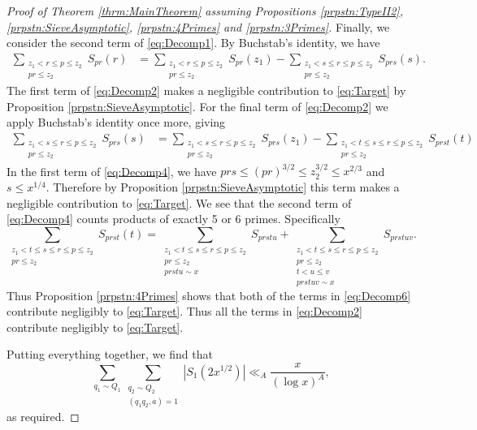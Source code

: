 \documentclass[10pt]{amsart}
\theoremstyle{plain}
\numberwithin{equation}{section}
\begin{document}
\begin{proof}[Proof of Theorem \ref{thrm:MainTheorem} assuming Propositions \ref{prpstn:TypeII2}, \ref{prpstn:SieveAsymptotic}, \ref{prpstn:4Primes} and \ref{prpstn:3Primes}]
Finally, we consider the second term of \eqref{eq:Decomp1}. By Buchstab's identity, we have
\begin{align}
\sum_{\substack{z_1< r\le p\le z_2\\ p r\le z_2}}S_{p r}( r)&=\sum_{\substack{z_1< r\le p\le z_2\\ p r\le z_2}}S_{p r}(z_1)-\sum_{\substack{z_1< s\le r\le p\le z_2\\ p r\le z_2}}S_{p r s}(s).\label{eq:Decomp2}
\end{align}
The first term of \eqref{eq:Decomp2} makes a negligible contribution to \eqref{eq:Target} by Proposition \ref{prpstn:SieveAsymptotic}. For the final term of \eqref{eq:Decomp2} we apply Buchstab's identity once more,
 giving
\begin{align}
\sum_{\substack{z_1< s\le r\le p\le z_2\\ p r\le z_2}}S_{p r s}(s)&=\sum_{\substack{z_1< s\le r\le p\le z_2\\ p r\le z_2}}S_{p r s}(z_1)-\sum_{\substack{z_1< t\le s\le r\le p\le z_2\\ p r\le z_2}}S_{p r s t}(t)
\label{eq:Decomp4}
\end{align}
In the first term of \eqref{eq:Decomp4}, we have $p r s\le (p r)^{3/2}\le z_2^{3/2}\le x^{2/3}$ and $s\le x^{1/4}$. Therefore by Proposition \ref{prpstn:SieveAsymptotic} this term makes a negligible contribution to \eqref{eq:Target}. We see that the second term of \eqref{eq:Decomp4} counts products of exactly 5 or 6 primes. Specifically
\begin{equation}
\sum_{\substack{z_1< t\le s\le r\le p\le z_2\\ p r\le z_2}}S_{p r s t}(t)=\sum_{\substack{z_1< t\le s\le r\le p\le z_2\\ p r\le z_2\\ p r s t u\sim x}}S_{p r s t u}+\sum_{\substack{z_1< t\le s\le r\le p\le z_2\\ p r\le z_2\\ t< u\le v\\ p r s t u v\sim x}}S_{p r s t u v}.
\label{eq:Decomp6}
\end{equation}
Thus Proposition \ref{prpstn:4Primes} shows that both of the terms  in \eqref{eq:Decomp6} contribute negligibly to \eqref{eq:Target}. Thus all the terms in \eqref{eq:Decomp2} contribute negligibly to \eqref{eq:Target}.

Putting everything together, we find that
\[
\sum_{q_1\sim Q_1}\sum_{\substack{q_2\sim Q_2\\ (q_1q_2,a)=1}}|S_1(2x^{1/2})|\ll_A\frac{x}{(\log{x})^A},
\]
as required.
\end{proof}
\end{document}
